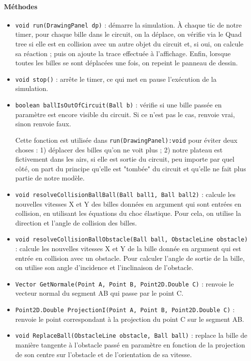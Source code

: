 \documentclass{report}
\begin{document}
\paragraph*{Méthodes}
\begin{itemize}
\item \texttt{void run(DrawingPanel dp)} : démarre la simulation. À chaque tic de notre timer, pour chaque bille dans le circuit, on la déplace, on vérifie via le Quad tree si elle est en collision avec un autre objet du circuit et, si oui, on calcule sa réaction ; puis on ajoute la trace effectuée à l'affichage. Enfin, lorsque toutes les billes se sont déplacées une fois, on repeint le panneau de dessin.
\item \texttt{void stop()} : arrête le timer, ce qui met en pause l'exécution de la simulation. 
\item \texttt{boolean ballIsOutOfCircuit(Ball b)} : vérifie si une bille passée en paramètre est encore visible du circuit. Si ce n'est pas le cas, renvoie vrai, sinon renvoie faux. 

Cette fonction est utilisée dans
\texttt{run(DrawingPanel):void} pour éviter deux choses : 1) déplacer des billes qu'on ne voit plus ; 2) notre plateau est fictivement dans les airs, si elle est sortie du circuit, peu importe par quel côté, on part du principe qu'elle est "tombée" du circuit et qu'elle ne fait plus partie de notre modèle.
\item \texttt{void resolveCollisionBallBall(Ball ball1, Ball ball2)} : calcule les nouvelles vitesses X et Y des billes données en argument qui sont entrées en collision, en utilisant les équations du choc élastique. Pour cela, on utilise la direction et l'angle de collision des billes.
\item \texttt{void resolveCollisionBallObstacle(Ball ball, ObstacleLine obstacle)} : calcule les nouvelles vitesses X et Y de la bille donnée en argument qui est entrée en collision avec un obstacle. Pour calculer l'angle de sortie de la bille, on utilise son angle d'incidence et l'inclinaison de l'obstacle.
\item \texttt{Vector GetNormale(Point A, Point B, Point2D.Double C)} : renvoie le vecteur normal du segment AB qui passe par le point C.
\item \texttt{Point2D.Double ProjectionI(Point A, Point B, Point2D.Double C)} : renvoie le point correspondant à la projection du point C sur le segment AB.
\item \texttt{void ReplaceBall(ObstacleLine obstacle, Ball ball)} : replace la bille de manière tangente à l'obstacle passé en paramètre en fonction de la projection de son centre sur l'obstacle et de l'orientation de sa vitesse.
\end{itemize}
\end{document}

